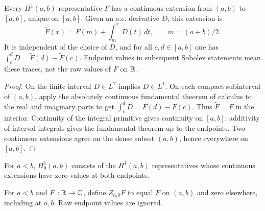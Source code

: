 \begin{lemma}
\label{lem:h1-interval-endpoints}
\leanok
Every $H^1(a,b)$ representative $F$ has a continuous extension from $(a,b)$
to $[a,b]$, unique on $[a,b]$. Given an a.e. derivative $D$, this extension is
\[
  \widetilde F(x)=F(m)+\int_m^xD(t)\,dt,\qquad m=(a+b)/2.
\]
It is independent of the choice of $D$, and for all $c,d\in[a,b]$ one has
$\int_c^d D=\widetilde F(d)-\widetilde F(c)$. Endpoint values in subsequent
Sobolev statements mean these traces, not the raw values of $F$ on $\mathbb{R}$.
\end{lemma}

\begin{proof}
\leanok
On the finite interval $D\in L^2$ implies $D\in L^1$. On each compact
subinterval of $(a,b)$, apply the absolutely continuous fundamental theorem
of calculus to the real and imaginary parts to get
$\int_c^d D=F(d)-F(c)$. Thus $\widetilde F=F$ in the interior. Continuity
of the integral primitive gives continuity on $[a,b]$; additivity of interval
integrals gives the fundamental theorem up to the endpoints. Two continuous
extensions agree on the dense subset $(a,b)$, hence everywhere on $[a,b]$.
\end{proof}

\begin{definition}
\label{def:h1-zero-interval}
\leanok
For $a<b$, $H^1_0(a,b)$ consists of the $H^1(a,b)$ representatives whose
continuous extensions have zero values at both endpoints.
\end{definition}

\begin{definition}
\label{def:interval-zero-extension}
\leanok
For $a<b$ and $F:\mathbb{R}\to\mathbb{C}$, define $Z_{a,b}F$ to equal $F$ on $(a,b)$
and zero elsewhere, including at $a,b$. Raw endpoint values are ignored.
\end{definition}

